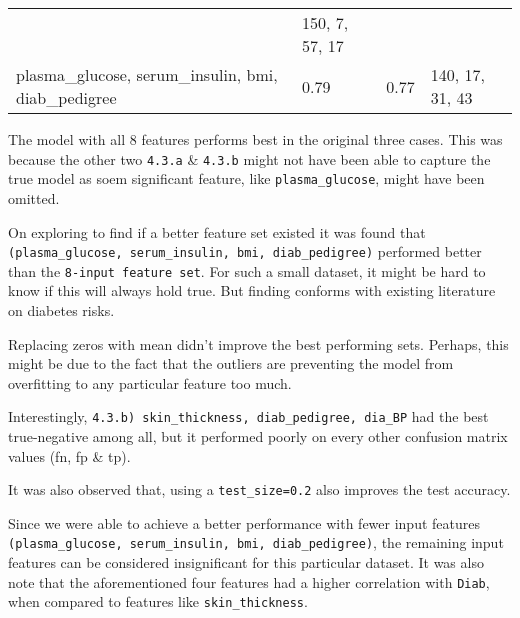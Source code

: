 \documentclass[11pt]{article}
\begin{document}
\begin{longtable}[]{@{}llll@{}}
\begin{minipage}[t]{0.22\columnwidth}
\end{minipage} & \begin{minipage}[t]{0.22\columnwidth}\raggedright
150, 7, 57, 17\strut
\end{minipage}\tabularnewline
\begin{minipage}[t]{0.22\columnwidth}\raggedright
plasma\_glucose, serum\_insulin, bmi, diab\_pedigree\strut
\end{minipage} & \begin{minipage}[t]{0.22\columnwidth}\raggedright
0.79\strut
\end{minipage} & \begin{minipage}[t]{0.22\columnwidth}\raggedright
0.77\strut
\end{minipage} & \begin{minipage}[t]{0.22\columnwidth}\raggedright
140, 17, 31, 43\strut
\end{minipage}\tabularnewline
\bottomrule
\end{longtable}



The model with all 8 features performs best in the original three cases.
This was because the other two \texttt{4.3.a} \& \texttt{4.3.b} might
not have been able to capture the true model as soem significant
feature, like \texttt{plasma\_glucose}, might have been omitted.

On exploring to find if a better feature set existed it was found that
\texttt{(plasma\_glucose,\ serum\_insulin,\ bmi,\ diab\_pedigree)}
performed better than the \texttt{8-input\ feature\ set}. For such a
small dataset, it might be hard to know if this will always hold true.
But finding conforms with existing literature on diabetes risks.

Replacing zeros with mean didn't improve the best performing sets.
Perhaps, this might be due to the fact that the outliers are preventing
the model from overfitting to any particular feature too much.

Interestingly,
\texttt{4.3.b)\ skin\_thickness,\ diab\_pedigree,\ dia\_BP} had the best
true-negative among all, but it performed poorly on every other
confusion matrix values (fn, fp \& tp).

It was also observed that, using a \texttt{test\_size=0.2} also improves
the test accuracy.

Since we were able to achieve a better performance with fewer input
features
\texttt{(plasma\_glucose,\ serum\_insulin,\ bmi,\ diab\_pedigree)}, the
remaining input features can be considered insignificant for this
particular dataset. It was also note that the aforementioned four
features had a higher correlation with \texttt{Diab}, when compared to
features like \texttt{skin\_thickness}.
\end{document}

